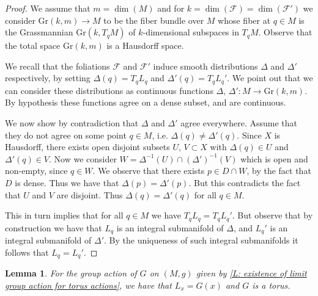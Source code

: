 \documentclass[12pt,a4paper,reqno]{amsart}
\newtheorem{lemma}[theorem]{Lemma}
\theoremstyle{definition}
\numberwithin{equation}{section}
\newcommand{\fol}{\mathcal{F}}
\newcommand{\Gr}{\mathrm{Gr}}
\DeclareMathOperator{\dime}{dim}
\begin{document}
\begin{proof}
We assume that $m = \dim(M)$ and  for $k=\dime(\fol)=\dime(\fol')$ we consider $\Gr(k,m)\to M$ to be the fiber bundle over $M$ whose fiber at $q\in M$ is the Grassmannian $\Gr(k,T_q M)$ of $k$-dimensional subspaces in $T_q M$. Observe that the total space $\Gr(k,m)$ is a Hausdorff space. 

We recall  that the foliations  $\fol$ and $\fol'$ induce smooth distributions $\Delta$ and $\Delta'$ respectively, by setting $\Delta(q) = T_q L_q$ and $\Delta'(q) = T_q L_q'$. We point out that we can consider these distributions as continuous functions $\Delta,\, \Delta'\colon M\to \Gr(k,m)$. By hypothesis these functions agree on a dense subset, and are continuous. 

We now show by contradiction that $\Delta$ and $\Delta'$ agree everywhere. Assume that they do not agree on some point $q\in M$, i.e. $\Delta(q)\neq \Delta'(q)$. Since $X$ is Hausdorff, there exists open disjoint subsets $U,\, V\subset X$ with $\Delta(q)\in U$ and $\Delta'(q)\in V$. Now we consider $W = \Delta^{-1}(U)\cap (\Delta')^{-1}(V)$ which is open and non-empty, since $q\in W$. We observe that there exists $p\in D\cap W$, by the fact that $D$ is dense. Thus we have that $\Delta(p) = \Delta'(p)$. But this contradicts the fact that $U$ and $V$ are disjoint. Thus $\Delta(q)=\Delta'(q)$ for all $q\in M$. 

This in turn implies that for all $q\in M$ we have $T_q L_q = T_q L_q'$. But observe that by construction we have that $L_q$ is an integral submanifold of $\Delta$, and $L_q'$ is an integral submanifold of $\Delta'$. By the uniqueness of such integral submanifolds it follows that $L_q = L_q'$.
\end{proof}


\begin{lemma}
For the group action of $G$ on $(M,g)$ given by \th\ref{L: existence of limit group action for torus actions}, we have that $L_x=G(x)$ and $G$ is a torus. 
\end{lemma}
\end{document}
